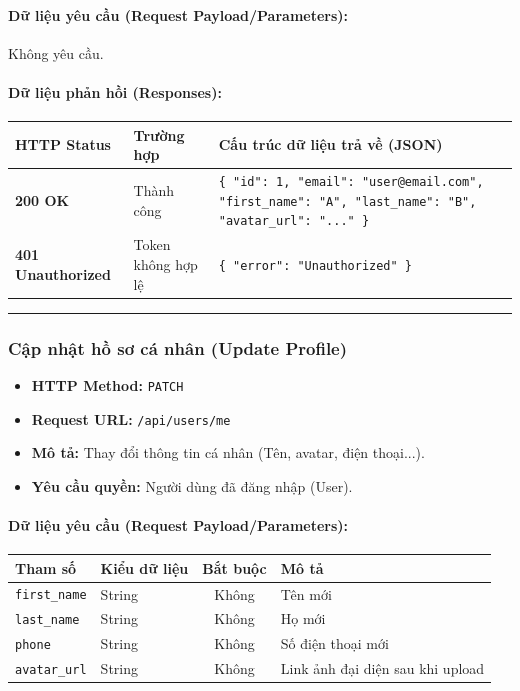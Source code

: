 \documentclass[12pt,a4paper]{article}
\begin{document}
\paragraph{Dữ liệu yêu cầu (Request Payload/Parameters):}
Không yêu cầu.\\

\paragraph{Dữ liệu phản hồi (Responses):}
\begin{longtable}{|p{2.8cm}|p{3.2cm}|p{8.0cm}|}
\hline
\textbf{HTTP Status} & \textbf{Trường hợp} & \textbf{Cấu trúc dữ liệu trả về (JSON)} \\ \hline
\endhead
\textbf{200 OK} & Thành công & \texttt{\{ "id": 1, "email": "user@email.com", "first\_name": "A", "last\_name": "B", "avatar\_url": "..." \}} \\ \hline
\textbf{401 Unauthorized} & Token không hợp lệ & \texttt{\{ "error": "Unauthorized" \}} \\ \hline
\end{longtable}

\vskip 0.4cm
\noindent\rule{\textwidth}{0.3pt}
\vskip 0.4cm

\subsubsection{Cập nhật hồ sơ cá nhân (Update Profile)}
\begin{itemize}[leftmargin=*]
    \item \textbf{HTTP Method:} \texttt{PATCH}
    \item \textbf{Request URL:} \texttt{/api/users/me}
    \item \textbf{Mô tả:} Thay đổi thông tin cá nhân (Tên, avatar, điện thoại...).
    \item \textbf{Yêu cầu quyền:} Người dùng đã đăng nhập (User).
\end{itemize}

\paragraph{Dữ liệu yêu cầu (Request Payload/Parameters):}
\begin{longtable}{|p{2.8cm}|p{2.2cm}|c|p{7.0cm}|}
\hline
\textbf{Tham số} & \textbf{Kiểu dữ liệu} & \textbf{Bắt buộc} & \textbf{Mô tả} \\ \hline
\endhead
\texttt{first\_name} & String & Không & Tên mới \\ \hline
\texttt{last\_name} & String & Không & Họ mới \\ \hline
\texttt{phone} & String & Không & Số điện thoại mới \\ \hline
\texttt{avatar\_url} & String & Không & Link ảnh đại diện sau khi upload \\ \hline
\end{longtable}
\end{document}
